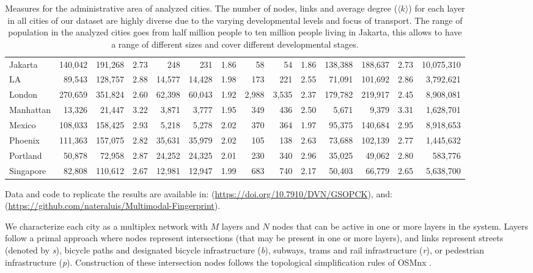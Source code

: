 \begin{table}[ht!]
\begin{adjustbox}{width=\textwidth,keepaspectratio}
\begin{tabular}{l|rrr|rrr|rrr|rrr|r}
			Jakarta    &  140,042 &  191,268 &  2.73 &     248 &    231 &  1.86 &     58 &    54 &  1.86 &  138,388 &  188,637 &  2.73 &  10,075,310 \\
			LA         &   89,543 &  128,757 &  2.88 &  14,577 &  14,428 &  1.98 &    173 &   221 &  2.55 &   71,091 &  101,692 &  2.86 &   3,792,621 \\
			London     &  270,659 &  351,824 &  2.60 &  62,398 &  60,043 &  1.92 &  2,988 &  3,535 &  2.37 &  179,782 &  219,917 &  2.45 &   8,908,081 \\
			Manhattan  &   13,326 &  21,447 &  3.22 &   3,871 &  3,777 &  1.95 &    349 &   436 &  2.50 &    5,671 &   9,379 &  3.31 &   1,628,701 \\
			Mexico     &  108,033 &  158,425 &  2.93 &   5,218 &  5,278 &  2.02 &    370 &   364 &  1.97 &   95,375 &  140,684 &  2.95 &   8,918,653 \\
			Phoenix    &  111,363 &  157,075 &  2.82 &  35,631 &  35,979 &  2.02 &    105 &   138 &  2.63 &   73,688 &  102,139 &  2.77 &   1,445,632 \\
			Portland   &   50,878 &  72,958 &  2.87 &  24,252 &  24,325 &  2.01 &    230 &   340 &  2.96 &   35,025 &  49,062 &  2.80 &     583,776 \\
			Singapore  &   82,808 &  110,612 &  2.67 &  12,981 &  12,947 &  1.99 &    683 &   740 &  2.17 &   50,403 &  66,779 &  2.65 &   5,638,700
			\end{tabular}
	\end{adjustbox}
	\caption{Measures for the administrative area of analyzed cities. The number of nodes, links and average degree ($\langle k \rangle$) for each layer in all cities of our dataset are highly diverse due to the varying developmental levels and focus of transport. The range of population in the analyzed cities goes from half million people to ten million people living in Jakarta, this allows to
	have a range of different sizes and cover different developmental stages.  
		\label{tab:Table1}}
\end{table}

Data and code to replicate the results are available in: (\url{https://doi.org/10.7910/DVN/GSOPCK}), and: (\url{https://github.com/nateraluis/Multimodal-Fingerprint}).

We characterize each city as a multiplex network \cite{Boccaletti2014Structure,Kivela2014Multilayer,Battiston2017Challenges} with $M$ layers and $N$ nodes that can be active in one or more layers in the system. Layers follow a primal approach \cite{Porta2006Primal} where nodes represent intersections (that may be present in one or more layers), and links represent streets (denoted by \textit{s}), bicycle paths and designated bicycle infrastructure (\textit{b}), subways, trams and rail infrastructure (\textit{r}), or pedestrian infrastructure (\textit{p}). Construction of these intersection nodes follows the topological simplification rules of OSMnx \cite{Boeing2017OSMNX}.

